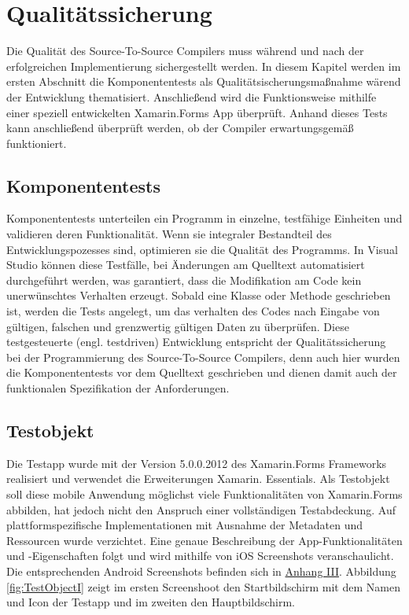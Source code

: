 \chapter{Qualitätssicherung}
\label{chap:Qualitätssicherung}
Die Qualität des Source-To-Source Compilers muss während und nach der erfolgreichen Implementierung sichergestellt werden. In diesem Kapitel werden im ersten Abschnitt die Komponententests als Qualitätsischerungsmaßnahme wärend der Entwicklung thematisiert.  Anschließend wird die Funktionsweise mithilfe einer speziell entwickelten Xamarin.Forms App überprüft.  Anhand dieses Tests kann anschließend überprüft werden, ob  der Compiler erwartungsgemäß funktioniert. 

\section{Komponententests}
Komponententests unterteilen ein Programm in einzelne,  testfähige Einheiten und validieren deren Funktionalität.  Wenn sie integraler Bestandteil des Entwicklungspozesses sind,  optimieren sie die Qualität des Programms. 
In Visual Studio können diese Testfälle, bei Änderungen am Quelltext automatisiert durchgeführt 
werden, was garantiert, dass die Modifikation am Code kein unerwünschtes Verhalten erzeugt.   Sobald eine Klasse oder Methode geschrieben ist, werden die Tests angelegt,  um das verhalten des Codes nach Eingabe von gültigen,  falschen und grenzwertig gültigen Daten zu überprüfen.
Diese testgesteuerte (engl. testdriven) Entwicklung entspricht der Qualitätssicherung bei 
der Programmierung des Source-To-Source Compilers, denn auch hier wurden die Komponententests vor dem Quelltext geschrieben und dienen damit auch der funktionalen Spezifikation der Anforderungen.
\newpage
\newpage

\section{Testobjekt}
Die Testapp wurde mit der Version 5.0.0.2012 des Xamarin.Forms Frameworks realisiert und verwendet die Erweiterungen Xamarin. Essentials.  Als Testobjekt soll diese mobile Anwendung möglichst viele Funktionalitäten von Xamarin.Forms abbilden,  hat jedoch nicht den Anspruch einer vollständigen Testabdeckung.
Auf plattformspezifische Implementationen mit Ausnahme der Metadaten und Ressourcen wurde verzichtet.  Eine genaue Beschreibung der App-Funktionalitäten und -Eigenschaften folgt und wird mithilfe von iOS Screenshots veranschaulicht.  Die entsprechenden Android Screenshots befinden sich in \hyperref[chap:AnhangAndroidScreenshots]{Anhang III}.  Abbildung \ref{fig:TestObjectI} zeigt im ersten Screenshoot den Startbildschirm mit dem Namen und Icon der Testapp und im zweiten den Hauptbildschirm.  


